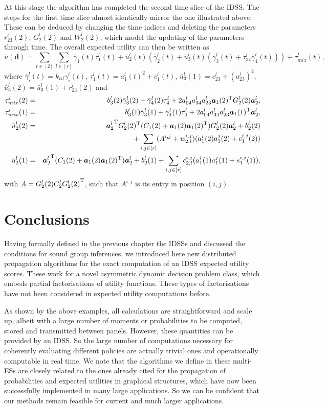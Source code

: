 At this stage the algorithm has completed the second time slice of the IDSS. The steps for the first time slice almost identically mirror the one illustrated above. These  can be deduced by changing the time indices and deleting the parameters $r_{23}^l(2)$, $G_2^l(2)$ and $W_2^l(2)$, which model the updating of the parameters through time.  The overall expected utility can then be written as
\begin{equation*}
\bar{u}(\bm{d})=\sum_{t\in[2]}\sum_{l\in[r]}\bar{\gamma}_1(t)\tau_1^l(t)+\bar{u}_2^l(t)(\bar{\gamma}_2^l(t)+\bar{u}_3^l(t)(\bar{\gamma}_3^l(t)+\tau_{34}^l\bar{\gamma}_4^l(t)))+\tau_{mix}^l(t),
\end{equation*}
where $\bar{\gamma}_i^l(t)=k_{til}\gamma_i^l(t)$, $\tau_1^l(t)=a_1^l(t)^2+c_1^l(t)$, $\bar{u}_3^l(1)=c_{23}^l+(a_{23}^l)^2$, $\bar{u}_3^l(2)=\bar{u}_3^l(1)+r_{23}^l(2)$ and 
\begin{eqnarray*}
\tau_{mix}^l(2)&=&b_3^l(2)\bar{\gamma}_3^l(2)+\bar{\gamma}_4^l(2)\tau_4^l+2a_{04}^la_{34}^la_{23}^l\bm{a}_1(2)^{\textnormal{T}} G_2^l(2)\bm{a}_2^l,\\
\tau_{mix}^l(1)&=&b_3^l(1)\bar{\gamma}_3^l(1)+\bar{\gamma}_4^l(1)\tau_4^l+2a_{04}^la_{34}^la_{23}^l\bm{a}_1(1)^{\textnormal{T}} \bm{a}_2^l,\\
\bar{u}_2^l(2)&=&{\bm{a}_2^l}^{\textnormal{T}} G_2^l(2)^{\textnormal{T}}(C_1(2)+\bm{a}_1(2)\bm{a}_1(2)^{\textnormal{T}})G_2^l(2)\bm{a}_2^l+b_2^l(2)\\
&&+\sum_{i,j\in[r]}(A^{i,j}+w^{i,j}_{2,l})(a^i_1(2)a_1^j(2)+c_1^{i,j}(2))\\
\bar{u}_2^l(1)&=&{\bm{a}_2^l}^{\textnormal{T}}(C_1(2)+\bm{a}_1(2)\bm{a}_1(2)^{\textnormal{T}})\bm{a}_2^l+b_2^l(1)+\sum_{i,j\in[r]}c_{2,l}^{i,j}(a^i_1(1)a_1^j(1)+s_1^{i,j}(1)),
\end{eqnarray*} 
with $A=G_{2}^l(2)C_{2}^l{G_{2}^l(2)}^{\textnormal{T}}$, such that $A^{i,j}$ is its entry in position $(i,j)$.

\section{Conclusions}
 Having formally defined in the previous chapter the IDSSs and discussed the conditions for sound group inferences, we introduced here new distributed propagation algorithms for the exact computation of an IDSS expected utility scores. These work for a novel asymmetric dynamic decision problem class, which embeds partial factorisations of utility functions. These types of factorisations have not been considered in expected utility computations before.
 
 As shown by the above examples, all calculations are straightforward and scale up, albeit with a large number of moments or probabilities to be computed, stored and transmitted between panels. However, these quantities can be provided by an IDSS. So the large number of computations necessary for coherently evaluating different policies  are  actually trivial ones and operationally computable in real time. We note that the algorithms we define in these multi-ESs are closely related to the ones already cited for the propagation of probabilities and expected utilities in graphical structures, which have now been successfully implemented in many large applications. So we can be confident that our methods remain feasible for current and much larger applications. 
\label{sec:conclusions4}